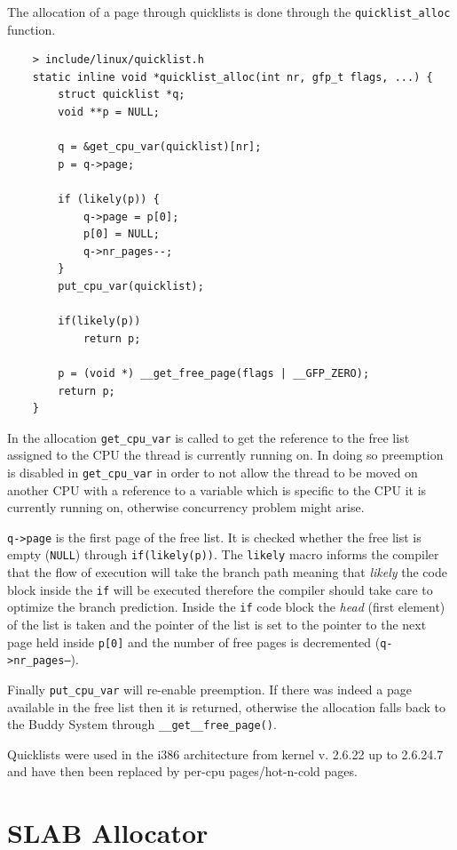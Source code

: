 \documentclass[twoside]{article}
\begin{document}
The allocation of a page through quicklists is done through the
\texttt{quicklist_alloc} function.

\begin{verbatim}
    > include/linux/quicklist.h
    static inline void *quicklist_alloc(int nr, gfp_t flags, ...) {
        struct quicklist *q;
        void **p = NULL;

        q = &get_cpu_var(quicklist)[nr];
        p = q->page;

        if (likely(p)) {
            q->page = p[0];
            p[0] = NULL;
            q->nr_pages--;
        }
        put_cpu_var(quicklist);

        if(likely(p))
            return p;

        p = (void *) __get_free_page(flags | __GFP_ZERO);
        return p;
    }
\end{verbatim}

In the allocation \texttt{get_cpu_var} is called to get the reference to the
free list assigned to the CPU the thread is currently running on. In doing
so preemption is disabled in \texttt{get_cpu_var} in order to not allow the
thread to be moved on another CPU with a reference to a variable which is
specific to the CPU it is currently running on, otherwise concurrency problem
might arise.

\texttt{q->page} is the first page of the free list. It is checked whether the
free list is empty (\texttt{NULL}) through \texttt{if(likely(p))}. The
\texttt{likely} macro informs the compiler that the flow of execution will take
the branch path meaning that \textit{likely} the code block inside the
\texttt{if} will be executed therefore the compiler should take care to optimize
the branch prediction. Inside the \texttt{if} code block the \textit{head}
(first element) of the list is taken and the pointer of the list is set to the
pointer to the next page held inside \texttt{p[0]} and the number of free pages
is decremented (\texttt{q->nr_pages--}).

Finally \texttt{put_cpu_var} will re-enable preemption. If there was indeed a
page available in the free list then it is returned, otherwise the allocation
falls back to the Buddy System through \texttt{__get__free_page()}.

Quicklists were used in the i386 architecture from kernel v. 2.6.22 up to
2.6.24.7 and have then been replaced by per-cpu pages/hot-n-cold pages.


\section{SLAB Allocator}
\end{document}

